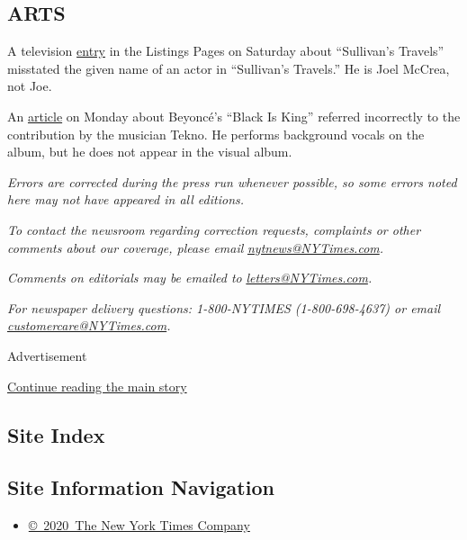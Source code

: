 \hypertarget{arts}{%
\subsection{ARTS}\label{arts}}

A television
\href{https://www.nytimes3xbfgragh.onion/2020/08/01/arts/television/whats-on-tv-saturday-seeing-america-with-megan-rapinoe-and-the-last-narc.html}{entry}
in the Listings Pages on Saturday about ``Sullivan's Travels'' misstated
the given name of an actor in ``Sullivan's Travels.'' He is Joel McCrea,
not Joe.

An
\href{https://www.nytimes3xbfgragh.onion/2020/07/31/arts/music/beyonce-black-is-king.html}{article}
on Monday about Beyoncé's ``Black Is King'' referred incorrectly to the
contribution by the musician Tekno. He performs background vocals on the
album, but he does not appear in the visual album.

\emph{Errors are corrected during the press run whenever possible, so
some errors noted here may not have appeared in all editions.}

\emph{To contact the newsroom regarding correction requests, complaints
or other comments about our coverage, please email}
\href{mailto:nytnews@NYTimes.com}{\emph{nytnews@NYTimes.com}}\emph{.}

\emph{Comments on editorials may be emailed to}
\href{mailto:letters@NYTimes.com}{\emph{letters@NYTimes.com}}\emph{.}

\emph{For newspaper delivery questions: 1-800-NYTIMES (1-800-698-4637)
or email}
\href{mailto:customercare@NYTimes.com}{\emph{customercare@NYTimes.com}}\emph{.}

Advertisement

\protect\hyperlink{after-bottom}{Continue reading the main story}

\hypertarget{site-index}{%
\subsection{Site Index}\label{site-index}}

\hypertarget{site-information-navigation}{%
\subsection{Site Information
Navigation}\label{site-information-navigation}}

\begin{itemize}
\tightlist
\item
  \href{https://help.nytimes3xbfgragh.onion/hc/en-us/articles/115014792127-Copyright-notice}{©~2020~The
  New York Times Company}
\end{itemize}

